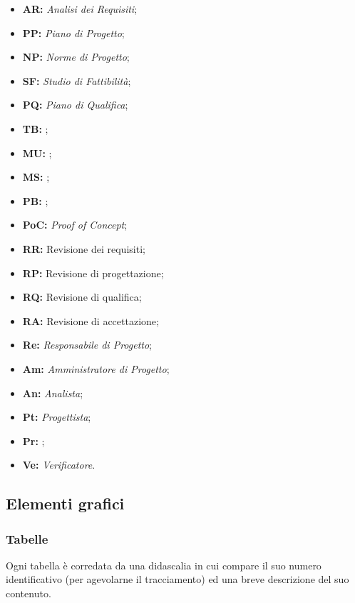 \documentclass[../NormediProgetto.tex]{subfiles}
\begin{document}
\begin{itemize}
	\item{\textbf{AR:}} \textit{Analisi dei Requisiti};
	\item{\textbf{PP:}} \textit{Piano di Progetto};
	\item{\textbf{NP:}} \textit{Norme di Progetto};
	\item{\textbf{SF:}} \textit{Studio di Fattibilità};
	\item{\textbf{PQ:}} \textit{Piano di Qualifica};
	\item{\textbf{TB:}} ;
	\item{\textbf{MU:}} ;
	\item{\textbf{MS:}} ;
	\item{\textbf{PB:}} ;
	\item{\textbf{PoC:}} \textit{Proof of Concept};
	\item{\textbf{RR:}} Revisione dei requisiti;
	\item{\textbf{RP:}} Revisione di progettazione;
	\item{\textbf{RQ:}} Revisione di qualifica;
	\item{\textbf{RA:}} Revisione di accettazione;
	\item{\textbf{Re:}} \textit{Responsabile di Progetto};
	\item{\textbf{Am:}} \textit{Amministratore di Progetto};
	\item{\textbf{An:}} \textit{Analista};
	\item{\textbf{Pt:}} \textit{Progettista};
	\item{\textbf{Pr:}} ;
	\item{\textbf{Ve:}} \textit{Verificatore}.
\end{itemize}

\subsection{Elementi grafici}

\subsubsection{Tabelle}

Ogni tabella è corredata da una didascalia in cui compare il suo numero identificativo (per agevolarne il tracciamento) ed una breve descrizione del suo contenuto.
\end{document}
